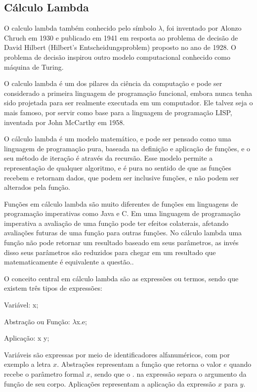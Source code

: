   \subsection{Cálculo Lambda}
    O calculo lambda também conhecido pelo símbolo $\lambda$, foi inventado por Alonzo Chruch em 1930 e publicado em 1941 em resposta ao problema de decisão de David Hilbert (Hilbert's Entscheidungsproblem) proposto no ano de 1928. O problema de decisão inspirou outro modelo computacional conhecido como máquina de Turing.\cite{WhatsLC:2013}

    O calculo lambda é um dos pilares da ciência da computação e pode ser considerado a primeira linguagem de programação funcional, embora nunca tenha sido projetada para ser realmente executada em um computador. Ele talvez seja o mais famoso, por servir como base para a linguagem de programação LISP, inventada por John McCarthy em 1958.\cite{WhatsLC:2013}

    O cálculo lambda é um modelo matemático, e pode ser pensado como uma linguagem de programação pura, baseada na definição e aplicação de funções, e o seu método de iteração é através da recursão. Esse modelo permite a representação de qualquer algoritmo, e é pura no sentido de que as funções recebem e retornam dados, que podem ser inclusive funções, e não podem ser alterados pela função.\nocite{FormalLC:2013}

    Funções em cálculo lambda são muito diferentes de funções em linguagens de programação imperativas como Java e C. Em uma linguagem de programação imperativa a avaliação de uma função pode ter efeitos colaterais, afetando avaliações futuras de uma função para outras funções. No cálculo lambda uma função não pode retornar um resultado baseado em seus parâmetros, as invés disso seus parâmetros são reduzidos para chegar em um resultado que matematicamente é equivalente a questão.\cite{IntroLambda:1989}.

    O conceito central em cálculo lambda são as expressões ou termos, sendo que existem três tipos de expressões:

    \begin{compactitem}
      \item Variável: x;
      \item Abstração ou Função: $\lambda$x.e;
      \item Aplicação: x y;
    \end{compactitem}

    Variáveis são expressas por meio de identificadores alfanuméricos, com por exemplo a letra $x$. Abstrações representam a função que retorna o valor $e$ quando recebe o parâmetro formal $x$, sendo que o $.$ na expressão separa o argumento da função de seu corpo. Aplicações representam a aplicação da expressão $x$ para $y$.


